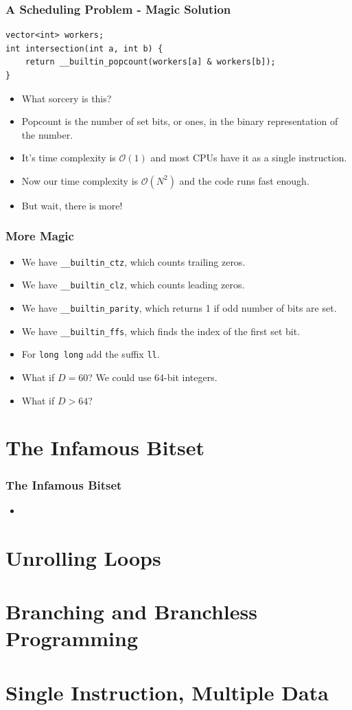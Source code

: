 \documentclass{beamer}
\begin{document}
\begin{frame}
	\frametitle{A Scheduling Problem - Magic Solution}
    \begin{verbatim}
vector<int> workers;
int intersection(int a, int b) {
    return __builtin_popcount(workers[a] & workers[b]);
}
    \end{verbatim}
    \begin{itemize}
        \item What sorcery is this?
        \item<2-> Popcount is the number of set bits, or ones, in the binary representation of the number.
        \item<3-> It's time complexity is $\mathcal{O}(1)$ and most CPUs have it as a single instruction.
        \item<4-> Now our time complexity is $\mathcal{O}(N^2)$ and the code runs fast enough.
        \item<4-> But wait, there is more!
    \end{itemize}
\end{frame}

\begin{frame}[plain]
    \frametitle{More Magic}
    \begin{itemize}
        \item<1-> We have \texttt{\_\_builtin\_ctz}, which counts trailing zeros.
        \item<2-> We have \texttt{\_\_builtin\_clz}, which counts leading zeros.
        \item<3-> We have \texttt{\_\_builtin\_parity}, which returns 1 if odd number of bits are set.
        \item<4-> We have \texttt{\_\_builtin\_ffs}, which finds the index of the first set bit.
        \item<5-> For \texttt{long long} add the suffix \texttt{ll}.
        \item<6-> What if $D = 60$? We could use 64-bit integers.
        \item<7-> What if $D > 64$?
    \end{itemize}
\end{frame}

\section*{The Infamous Bitset}

\begin{frame}
    \frametitle{The Infamous Bitset}
    \begin{itemize}
        \item 
    \end{itemize}
\end{frame}

\section*{Unrolling Loops}

\section*{Branching and Branchless Programming}

\section*{Single Instruction, Multiple Data}
\end{document}

